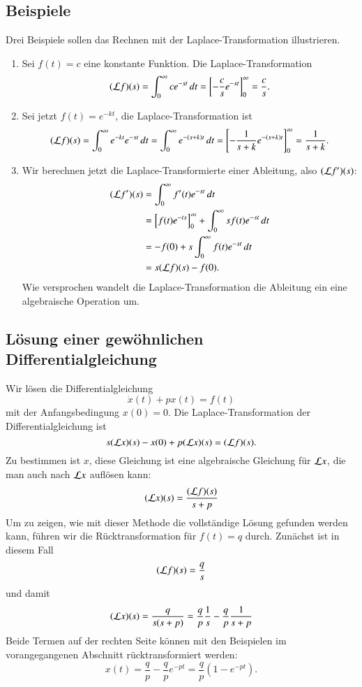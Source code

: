 \subsection{Beispiele}
Drei Beispiele sollen das Rechnen mit der Laplace-Transformation
illustrieren.
\begin{enumerate}
\item
Sei $f(t)=c$ eine konstante Funktion. Die Laplace-Transformation
\[
({\cal L}f)(s)
=
\int_0^\infty ce^{-st}\,dt
=
\left[
-\frac{c}{s}e^{-st}
\right]_0^\infty=\frac{c}{s}.
\]

\item
Sei jetzt $f(t)=e^{-kt}$, die Laplace-Transformation ist
\[
({\cal L}f)(s)=\int_0^\infty e^{-kt}e^{-st}\,dt
=\int_0^{\infty}e^{-(s+k)t}\,dt
=
\left[
- \frac1{s+k}e^{-(s+k)t}
\right]_0^\infty
=\frac1{s+k}.
\]

\item
Wir berechnen jetzt die Laplace-Transformierte einer Ableitung, also
$({\cal L}f')(s)$:
\begin{align*}
({\cal L}f')(s)
&=
\int_0^\infty f'(t)e^{-st}\,dt
\\
&=
\left[f(t)e^{-ts}\right]_0^\infty
+
\int_0^\infty sf(t)e^{-st}\,dt
\\
&=
-f(0)+s\int_0^\infty f(t)e^{-st}\,dt
\\
&=s({\cal L}f)(s)-f(0).
\end{align*}
Wie versprochen wandelt die Laplace-Transformation die Ableitung
ein eine algebraische Operation um.
\end{enumerate}

\subsection{Lösung einer gewöhnlichen Differentialgleichung}
Wir lösen die Differentialgleichung
\[
\dot x(t)+px(t)=f(t)
\]
mit der Anfangsbedingung $x(0)=0$.
Die Laplace-Transformation der Differentialgleichung ist
\[
s({\cal L}x)(s)-x(0)+p({\cal L}x)(s)=({\cal L}f)(s).
\]
Zu bestimmen ist $x$, diese Gleichung ist eine algebraische Gleichung
für ${\cal L}x$, die man auch nach ${\cal L}x$ auflösen kann:
\[
({\cal L}x)(s)
=
\frac{({\cal L}f)(s)}{s+p}
\]
Um zu zeigen, wie mit dieser Methode die vollständige Lösung gefunden
werden kann, führen wir die Rücktransformation für $f(t)=q$ durch.
Zunächst ist in diesem Fall
\[
({\cal L}f)(s)=\frac{q}{s}
\]
und damit 
\[
({\cal L}x)(s)
=
\frac{q}{s(s+p)}=\frac{q}{p}\frac{1}{s}-\frac{q}{p}\frac{1}{s+p}
\]
Beide Termen auf der rechten Seite können mit den Beispielen im vorangegangenen
Abschnitt rücktransformiert werden:
\[
x(t)=\frac{q}{p}-\frac{q}{p}e^{-pt}=\frac{q}{p}(1-e^{-pt}).
\]

